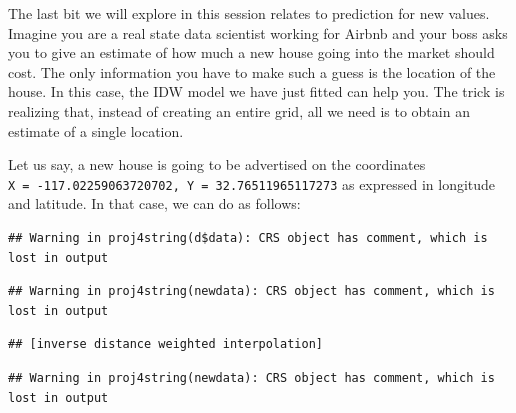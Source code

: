 \documentclass[
]{book}
\newenvironment{Shaded}{\begin{snugshade}}{\end{snugshade}}
\newcommand{\DataTypeTok}[1]{\textcolor[rgb]{0.13,0.29,0.53}{#1}}
\newcommand{\DecValTok}[1]{\textcolor[rgb]{0.00,0.00,0.81}{#1}}
\newcommand{\FloatTok}[1]{\textcolor[rgb]{0.00,0.00,0.81}{#1}}
\newcommand{\KeywordTok}[1]{\textcolor[rgb]{0.13,0.29,0.53}{\textbf{#1}}}
\newcommand{\NormalTok}[1]{#1}
\newcommand{\OperatorTok}[1]{\textcolor[rgb]{0.81,0.36,0.00}{\textbf{#1}}}
\newcommand{\StringTok}[1]{\textcolor[rgb]{0.31,0.60,0.02}{#1}}
\begin{document}
The last bit we will explore in this session relates to prediction for new values. Imagine you are a real state data scientist working for Airbnb and your boss asks you to give an estimate of how much a new house going into the market should cost. The only information you have to make such a guess is the location of the house. In this case, the IDW model we have just fitted can help you. The trick is realizing that, instead of creating an entire grid, all we need is to obtain an estimate of a single location.

Let us say, a new house is going to be advertised on the coordinates \texttt{X\ =\ -117.02259063720702,\ Y\ =\ 32.76511965117273} as expressed in longitude and latitude. In that case, we can do as follows:

\begin{Shaded}
\end{Shaded}

\begin{verbatim}
## Warning in proj4string(d$data): CRS object has comment, which is lost in output
\end{verbatim}

\begin{verbatim}
## Warning in proj4string(newdata): CRS object has comment, which is lost in output
\end{verbatim}

\begin{verbatim}
## [inverse distance weighted interpolation]
\end{verbatim}

\begin{verbatim}
## Warning in proj4string(newdata): CRS object has comment, which is lost in output
\end{verbatim}
\end{document}
